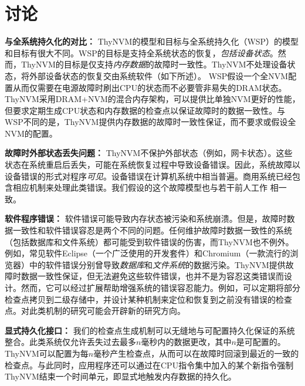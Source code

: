 \section{讨论}
\label{sec:thynvm-discuss}

\textbf{与全系统持久化的对比：}
ThyNVM的模型和目标与全系统持久化（WSP）\cite{Narayanan:2012:WP:2150976.2151018}的模型和目标有很大不同。WSP的目标是支持全系统状态的恢复，\emph{包括设备状态}。然而，ThyNVM的目标是仅支持\emph{内存数据}的故障时一致性。ThyNVM不处理设备状态，将外部设备状态的恢复交由系统软件（如下所述）。 WSP假设一个全NVM配置从而仅需要在电源故障时刷出CPU的状态而不必要管非易失的DRAM状态。
ThyNVM采用DRAM+NVM的混合内存架构，可以提供比单独NVM更好的性能\cite{Qureshi:2009:SHP:1555754.1555760, 6378661}，但要求定期生成CPU状态和内存数据的检查点以保证故障时的数据一致性。与WSP不同的是，ThyNVM提供内存数据的故障时一致性保证，而不要求或假设全NVM的配置。

\textbf{故障时外部状态丢失问题：}
ThyNVM不保护外部状态（例如，网卡状态）。这些状态在系统重启后丢失，可能在系统恢复过程中导致设备错误。因此，系统故障以设备错误的形式对程序\emph{可见}。设备错误在计算机系统中相当普遍\cite{Ghemawat:2003:GFS:945445.945450, Ford:2010:AGD:1924943.1924948}。商用系统已经包含相应机制来处理此类错误\cite{cpp:exceptions, Robillard:1999:AEF:318773.319251, Ogasawara:2006:EEO:1111596.1111598}。我们假设的这个故障模型也与若干前人工作
\cite{1003568,1003567,Goodenough:1975:EHI:361227.361230,4222585}相一致。

\textbf{软件程序错误：}
软件错误可能导致内存状态被污染和系统崩溃。但是，故障时数据一致性和软件错误容忍是两个不同的问题。任何维护故障时数据一致性的系统（包括数据库和文件系统）都可能受到软件错误的伤害，而ThyNVM也不例外。例如，常见软件Eclipse（一个广泛使用的开发套件）和Chromium（一款流行的浏览器）中的软件错误分别曾导致\emph{数据库}和\emph{文件系统}的数据污染\cite{eclipse:bug,chrom:bug}。ThyNVM提供故障时数据一致性保证，但无法避免这些软件错误，也并不是为容忍这类错误而设计。然而，它可以经过扩展帮助增强系统的错误容忍能力。例如，可以定期将部分检查点拷贝到二级存储中，并设计某种机制来定位和恢复到之前没有错误的检查点。对此类机制的研究可能会开辟新的研究方向。

\textbf{显式持久化接口：}
我们的检查点生成机制可以无缝地与可配置持久化保证的系统\cite{Ports:2010:TCA:1924943.1924963,
Cipar:2012:LTF:2168836.2168854,
Mickens:2014:BFC:2616448.2616473}整合。此类系统仅允许丢失过去最多$n$毫秒内的数据更改，其中$n$是可配置的。ThyNVM可以配置为每$n$毫秒产生检查点，从而可以在故障时回滚到最近的一致的检查点。与此同时，应用程序还可以通过在CPU指令集中加入的某个新指令强制ThyNVM结束一个时间单元，即显式地触发内存数据的持久化。


